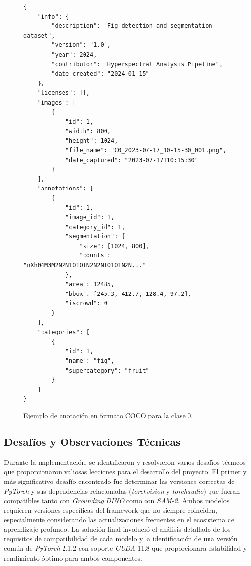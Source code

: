 \begin{figure}[H]
\centering
\small
\begin{verbatim}
{
    "info": {
        "description": "Fig detection and segmentation dataset",
        "version": "1.0",
        "year": 2024,
        "contributor": "Hyperspectral Analysis Pipeline",
        "date_created": "2024-01-15"
    },
    "licenses": [],
    "images": [
        {
            "id": 1,
            "width": 800,
            "height": 1024,
            "file_name": "C0_2023-07-17_10-15-30_001.png",
            "date_captured": "2023-07-17T10:15:30"
        }
    ],
    "annotations": [
        {
            "id": 1,
            "image_id": 1,
            "category_id": 1,
            "segmentation": {
                "size": [1024, 800],
                "counts": "nXh04M3M2N2N1O1O1N2N2N1O1O1N2N..."
            },
            "area": 12485,
            "bbox": [245.3, 412.7, 128.4, 97.2],
            "iscrowd": 0
        }
    ],
    "categories": [
        {
            "id": 1,
            "name": "fig",
            "supercategory": "fruit"
        }
    ]
}
\end{verbatim}
\caption{Ejemplo de anotación en formato COCO para la clase 0.}
\end{figure}

\subsection{Desafíos y Observaciones Técnicas}

Durante la implementación, se identificaron y resolvieron varios desafíos técnicos que proporcionaron valiosas lecciones para el desarrollo del proyecto. El primer y más significativo desafío encontrado fue determinar las versiones correctas de \emph{PyTorch} y sus dependencias relacionadas (\emph{torchvision} y \emph{torchaudio}) que fueran compatibles tanto con \emph{Grounding DINO} como con \emph{SAM-2}. Ambos modelos requieren versiones específicas del framework que no siempre coinciden, especialmente considerando las actualizaciones frecuentes en el ecosistema de aprendizaje profundo. La solución final involucró el análisis detallado de los requisitos de compatibilidad de cada modelo y la identificación de una versión común de \emph{PyTorch} 2.1.2 con soporte \emph{CUDA} 11.8 que proporcionara estabilidad y rendimiento óptimo para ambos componentes.

\vspace{5mm}

